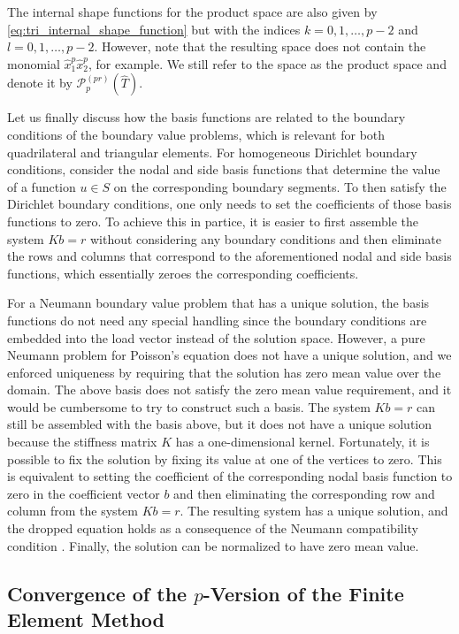 \documentclass[english, 12pt, a4paper, sci, utf8, a-2b, online]{aaltothesis}
\theoremstyle{definition}
\theoremstyle{plain}
\numberwithin{equation}{section}
\begin{document}
The internal shape functions for the product space are also given by 
\eqref{eq:tri_internal_shape_function} but with the indices
$k=0,1,\dotsc,p-2$ and $l=0,1,\dotsc,p-2$.
However, note that the resulting space does not contain the monomial $\hat{x}_1^p \hat{x}_2^p$,
for example. We still refer to the space as the product space and denote it by
$\mathcal{P}_p^{(pr)}(\widehat{T})$.

Let us finally discuss how the basis functions are related to the boundary conditions
of the boundary value problems, which is relevant for both quadrilateral and triangular elements.
For homogeneous Dirichlet boundary conditions,
consider the nodal and side basis functions that determine the value of a function $u \in S$
on the corresponding boundary segments. To then satisfy the Dirichlet boundary conditions,
one only needs to set the coefficients of those basis functions to zero.
To achieve this in partice, it is easier to first assemble the system $Kb = r$
without considering any boundary conditions and then eliminate the rows and columns
that correspond to the aforementioned nodal and side basis functions,
which essentially zeroes the corresponding coefficients.

For a Neumann boundary value problem that has a unique solution,
the basis functions do not need any special handling
since the boundary conditions are embedded into the load vector instead of the solution space.
However, a pure Neumann problem for Poisson's equation does not have a unique solution,
and we enforced uniqueness by requiring that the solution has zero mean value over the domain.
The above basis does not satisfy the zero mean value requirement,
and it would be cumbersome to try to construct such a basis.
The system $Kb = r$ can still be assembled with the basis above,
but it does not have a unique solution because the stiffness matrix $K$ has a one-dimensional 
kernel. Fortunately, it is possible to fix the solution by fixing its value at one
of the vertices to zero.
This is equivalent to setting the coefficient of the corresponding nodal basis function
to zero in the coefficient vector $b$ and then eliminating the corresponding row and column
from the system $Kb = r$. The resulting system has a unique solution, and
the dropped equation holds as a consequence of the Neumann compatibility condition
\cite{braess2007}. Finally, the solution can be normalized to have zero mean value.

\subsection{Convergence of the \texorpdfstring{$p$}{p}-Version of the Finite Element Method}
\label{subsec:convergence_properties_of_the_p_version}
\end{document}

